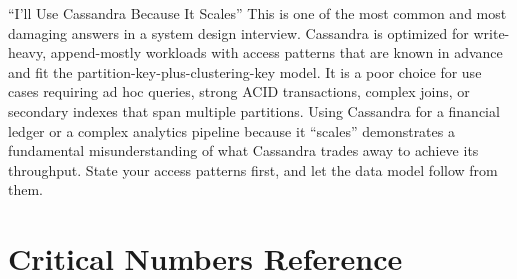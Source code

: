 \documentclass[11pt,a4paper]{article}
\begin{document}
\begin{trapbox}{``I'll Use Cassandra Because It Scales''}
This is one of the most common and most damaging answers in a system design interview. Cassandra is optimized for write-heavy, append-mostly workloads with access patterns that are known in advance and fit the partition-key-plus-clustering-key model. It is a poor choice for use cases requiring ad hoc queries, strong ACID transactions, complex joins, or secondary indexes that span multiple partitions. Using Cassandra for a financial ledger or a complex analytics pipeline because it ``scales'' demonstrates a fundamental misunderstanding of what Cassandra trades away to achieve its throughput. State your access patterns first, and let the data model follow from them.
\end{trapbox}

\section{Critical Numbers Reference}
\end{document}
